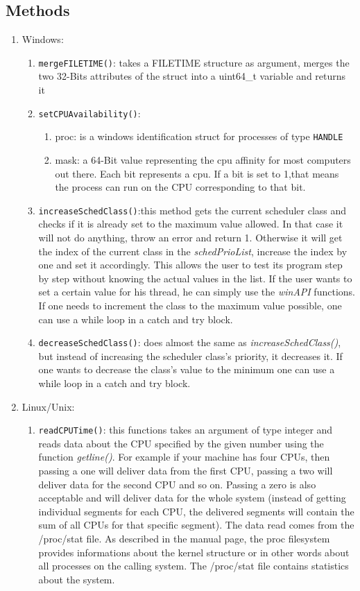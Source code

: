 \subsection{Methods}
\label{system-methods}
\begin{enumerate}
	\item Windows:
	\begin{enumerate}
		\item \texttt{mergeFILETIME()}: takes a FILETIME structure as argument, merges the two 32-Bits attributes of the struct into a uint64\_t variable and returns it
		\item \texttt{setCPUAvailability()}:
		\begin{enumerate}
			\item proc: is a windows identification struct for processes of type \texttt{HANDLE}
			\item mask: a 64-Bit value representing the cpu affinity for most computers out there. Each bit represents a cpu. If a bit is set to 1,that means the process can run on the CPU corresponding to that bit.
		\end{enumerate}
		\item \texttt{increaseSchedClass()}:this method gets the current scheduler class and checks if it is already set to the maximum value allowed. In that case it will not do anything, throw an error and return 1. Otherwise it will get the index of the current class in the \textit{schedPrioList}, increase the index by one and set it accordingly. This allows the user to test its program step by step without knowing the actual values in the list. If the user wants to set a certain value for his thread, he can simply use the \textit{winAPI} functions. If one needs to increment the class to the maximum value possible, one can use a while loop in a catch and try block.
		\item \texttt{decreaseSchedClass()}: does almost the same as \textit{increaseSchedClass()}, but instead of increasing the scheduler class's priority, it decreases it. If one wants to decrease the class's value to the minimum one can use a while loop in a catch and try block.
	\end{enumerate}
	\item Linux/Unix:
	\begin{enumerate}
		\item \texttt{readCPUTime()}: this functions takes an argument of type integer and reads data about the CPU specified by the given number using the function \textit{getline()}. For example if your machine has four CPUs, then passing a one will deliver data from the first CPU, passing a two will deliver data for the second CPU and so on. Passing a zero is also acceptable and will deliver data for the whole system (instead of getting individual segments for each CPU, the delivered segments will contain the sum of all CPUs for that specific segment). The data read comes from the \dq/proc/stat\dq{} file. As described in the manual page, the proc filesystem provides informations about the kernel structure or in other words about all processes on the calling system. The \dq/proc/stat\dq{} file contains statistics about the system.\\

\end{enumerate}
\end{enumerate}
